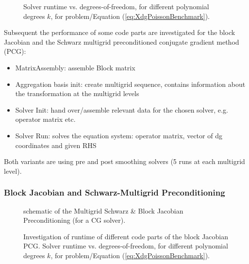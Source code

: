 \graphicspath{{./apdx-NodeSolverPerformance/XDGPoisson/plots/}}

\begin{figure}[!h]
	\begin{center}
		
	\end{center}
	\caption{
		Solver runtime vs. degrees-of-freedom, for different polynomial degrees $k$,
		for problem/Equation (\ref{eq:XdgPoissonBenchmark}).
	}
	\label{fig:XdgRuntimes}
\end{figure}
\newpage
Subsequent the performance of some code parts are investigated for the block Jacobian and the Schwarz multigrid preconditioned conjugate gradient method (PCG):
\begin{itemize}
	\item MatrixAssembly: assemble Block matrix
	\item Aggregation basis init: create multigrid sequence, contains information about the transformation at the multigrid levels
	\item Solver Init: hand over/assemble relevant data for the chosen solver, e.g. operator matrix etc.
	\item Solver Run: solves the equation system: operator matrix, vector of dg coordinates and given RHS 
\end{itemize}
Both variants are using pre and post smoothing solvers (5 runs at each multigrid level).

\subsubsection{Block Jacobian and Schwarz-Multigrid Preconditioning}

\begin{figure}[!h]
	\begin{center}
		
	\end{center}
	\caption{
		schematic of the Multigrid Schwarz \& Block Jacobian Preconditioning (for a CG solver).
	}
	\label{fig:schema_BlockPCG_2}
\end{figure}

\begin{figure}[!h]
	\begin{center}
		
	\end{center}
	\caption{
		Investigation of runtime of different code parts of the block Jacobian PCG. Solver runtime vs. degrees-of-freedom, for different polynomial degrees $k$,
		for problem/Equation (\ref{eq:XdgPoissonBenchmark}).
	}
	\label{fig:Xdg_blockJacobianPCG}
\end{figure}

